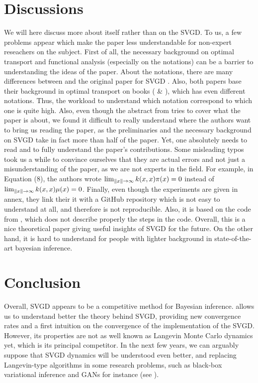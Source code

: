 \documentclass{article}
\DeclarePairedDelimiter{\norm}{\|}{\|}
\begin{document}
\section{Discussions}
We will here discuss more about \cite{main-paper} itself rather than on the SVGD. To us, a few problems appear  which make the paper less understandable for non-expert reseachers on the subject. \newline
First of all, the necessary background on optimal transport and functional analysis (especially on the notations) can be a barrier to understanding the ideas of the paper. About the notations, there are many differences between \cite{main-paper} and the original paper for SVGD \cite{Original-SVGD}. Also, both papers base their background in optimal transport on books (\cite{villani2003} \& \cite{villani2008}), which has even different notations. Thus, the workload to understand which notation correspond to which one is quite high. \newline
Also, even though the abstract from \cite{main-paper} tries to cover what the paper is about, we found it difficult to really understand where the authors want to bring us reading the paper, as the preliminaries and the necessary background on SVGD take in fact more than half of the paper.
Yet, one absolutely needs to read \cite{Original-SVGD} and \cite{SVGD-flow} to fully understand the paper's contributions. \newline
Some misleading typos took us a while to convince ourselves that they are actual errors and not
just a misunderstanding of the paper, as we are not experts in the field. For example,
in Equation (8), the authors wrote $\lim_{\norm{x} \to \infty} k(x, x)\pi(x) = 0$ instead of $\lim_{\norm{x} \to \infty} k(x, x)\mu(x) = 0$. \newline
Finally, even though the experiments are given in annex, they link their it with a GitHub repository which is not easy to understand at all, and therefore is not reproducible. Also, it is based on the code from \cite{Original-SVGD}, which does not describe properly the steps in the code. \newline
Overall, this is a nice theoretical paper giving useful insights of SVGD for the future. On the other hand, it is hard to understand for people with lighter background in state-of-the-art bayesian inference.
 
\section{Conclusion}
Overall, SVGD appears to be a competitive method for Bayesian inference. \cite{main-paper} allows us to understand better the theory behind SVGD,
providing new convergence rates and a first intuition on the convergence of the implementation of the SVGD. However, its properties are not as well known as Langevin Monte Carlo dynamics yet, which is its principal competitor. In the next few years, we can arguably suppose that SVGD dynamics will be understood even better, and replacing Langevin-type algorithms in some research problems, such as black-box variational inference and GANs for instance (see \cite{ccl}). 
\end{document}
